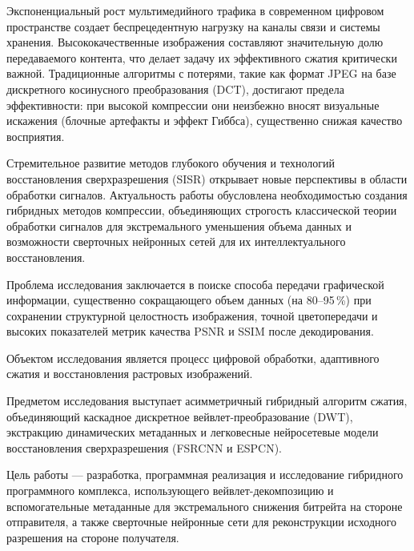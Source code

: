 
Экспоненциальный рост мультимедийного трафика в современном цифровом пространстве создает беспрецедентную нагрузку на каналы связи и системы хранения. Высококачественные изображения составляют значительную долю передаваемого контента, что делает задачу их эффективного сжатия критически важной. Традиционные алгоритмы с потерями, такие как формат JPEG на базе дискретного косинусного преобразования (DCT), достигают предела эффективности: при высокой компрессии они неизбежно вносят визуальные искажения (блочные артефакты и эффект Гиббса), существенно снижая качество восприятия.

Стремительное развитие методов глубокого обучения и технологий восстановления сверхразрешения (SISR) открывает новые перспективы в области обработки сигналов. Актуальность работы обусловлена необходимостью создания гибридных методов компрессии, объединяющих строгость классической теории обработки сигналов для экстремального уменьшения объема данных и возможности сверточных нейронных сетей для их интеллектуального восстановления.

Проблема исследования заключается в поиске способа передачи графической информации, существенно сокращающего объем данных (на 80–95\,\%) при сохранении структурной целостность изображения, точной цветопередачи и высоких показателей метрик качества PSNR и SSIM после декодирования.

Объектом исследования является процесс цифровой обработки, адаптивного сжатия и восстановления растровых изображений.

Предметом исследования выступает асимметричный гибридный алгоритм сжатия, объединяющий каскадное дискретное вейвлет-преобразование (DWT), экстракцию динамических метаданных и легковесные нейросетевые модели восстановления сверхразрешения (FSRCNN и ESPCN).

Цель работы — разработка, программная реализация и исследование гибридного программного комплекса, использующего вейвлет-декомпозицию и вспомогательные метаданные для экстремального снижения битрейта на стороне отправителя, а также сверточные нейронные сети для реконструкции исходного разрешения на стороне получателя.

